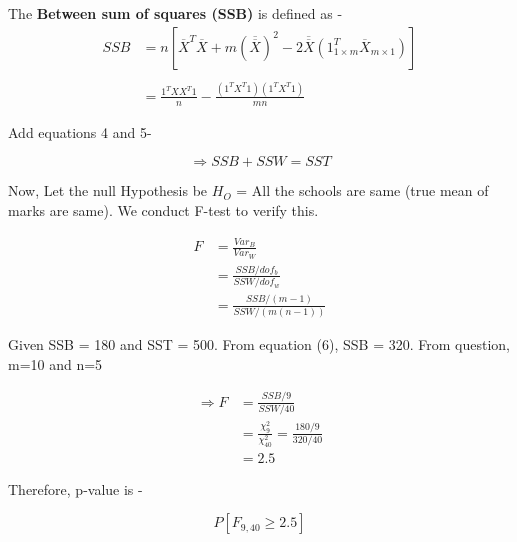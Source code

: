 \documentclass{article}
\begin{document}
The \textbf{Between sum of squares (SSB)} is defined as - 
\begin{equation}
\begin{split}
    SSB &= n[\overline{X}^T \overline{X} + m (\overline{\overline{X}})^2 -2 \overline{\overline{X}} (1^T_{1\times m} \overline{X}_{m\times 1} )] \\
       \\
        &= \frac{1^T X X^T 1}{n} - \frac{(1^T X^T 1)(1^T X^T 1)}{mn}
\end{split}
\end{equation}

\vspace{0.3 cm}

Add equations 4 and 5-

\begin{equation}
    \Rightarrow SSB + SSW = SST
\end{equation}

Now, Let the null Hypothesis be $H_O$ = All the schools are same (true mean of marks are same). We conduct F-test to verify this. 

\begin{equation}
\begin{split}
    F & = \frac{Var_B}{Var_W} \\
      & = \frac{SSB/dof_b}{SSW/dof_w} \\
      & = \frac{SSB/(m-1) }{SSW/(m (n-1))}
\end{split}
\end{equation}

Given SSB = 180 and SST = 500. From equation (6), SSB = 320. From question, m=10 and n=5

\begin{equation}
\begin{split}
    \Rightarrow F &= \frac{SSB/9 }{SSW/40} \\
        &= \frac{\chi^2_9}{\chi^2_{40}} = \frac{180/9}{320/40} \\
        &= 2.5
\end{split}
\end{equation}

Therefore, p-value is - 

\begin{equation}
    P[F_{9,40} \geq 2.5]
\end{equation}
\end{document}
